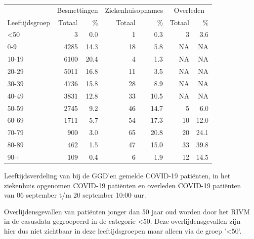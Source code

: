 \documentclass[
  english,
  man,floatsintext]{apa6}
\begin{document}
\begin{table}
\centering\begingroup\fontsize{11}{13}\selectfont

\begin{threeparttable}
\begin{tabular}{lrrrrrr}
\toprule
\multicolumn{1}{c}{ } & \multicolumn{2}{c}{Besmettingen} & \multicolumn{2}{c}{Ziekenhuisopnames} & \multicolumn{2}{c}{Overleden} \\
\cmidrule(l{3pt}r{3pt}){2-3} \cmidrule(l{3pt}r{3pt}){4-5} \cmidrule(l{3pt}r{3pt}){6-7}
Leeftijdsgroep & Totaal & \% & Totaal & \% & Totaal & \%\\
\midrule
<50 & 3 & 0.0 & 1 & 0.3 & 3 & 3.6\\
0-9 & 4285 & 14.3 & 18 & 5.8 & NA & NA\\
10-19 & 6100 & 20.4 & 4 & 1.3 & NA & NA\\
20-29 & 5011 & 16.8 & 11 & 3.5 & NA & NA\\
30-39 & 4736 & 15.8 & 28 & 8.9 & NA & NA\\
40-49 & 3831 & 12.8 & 33 & 10.5 & NA & NA\\
50-59 & 2745 & 9.2 & 46 & 14.7 & 5 & 6.0\\
60-69 & 1711 & 5.7 & 54 & 17.3 & 10 & 12.0\\
70-79 & 900 & 3.0 & 65 & 20.8 & 20 & 24.1\\
80-89 & 462 & 1.5 & 47 & 15.0 & 33 & 39.8\\
90+ & 109 & 0.4 & 6 & 1.9 & 12 & 14.5\\
\bottomrule
\end{tabular}
\begin{tablenotes}
\item[1] Leeftijdsverdeling van bij de GGD’en gemelde COVID-19 patiënten, in het ziekenhuis opgenomen COVID-19 patiënten en overleden COVID-19 patiënten van 06 september t/m 20 september 10:00 uur.
\item[2] Overlijdensgevallen van patiënten jonger dan 50 jaar oud worden door het RIVM in de casusdata gegroepeerd in de categorie <50. Deze overlijdensgevallen zijn hier dus niet zichtbaar in deze leeftijdsgroepen maar alleen via de groep '<50'.
\end{tablenotes}
\end{threeparttable}
\endgroup{}
\end{table}

\newpage
\end{document}
